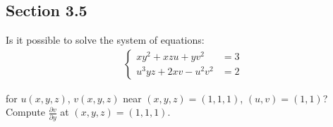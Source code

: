 \subsection{Section 3.5}

\begin{tcolorbox}[
        title={Problem 18},
        valign=center,
        nobeforeafter,
        colframe=gray!95!black
    ]
Is it possible to solve the system of equations:
\begin{align}
    \begin{cases}
        xy^2 + xzu + yv^2 &= 3 \\
    u^3yz + 2xv - u^2v^2 &= 2
    \end{cases}
\end{align}

for \(u(x, y, z)\), \(v(x, y, z)\) near
\((x, y, z) = (1, 1, 1)\), \((u, v) = (1, 1)\)? \\

Compute \(\frac{\partial v}{\partial y}\) at \((x, y, z) = (1, 1, 1)\).
\end{tcolorbox}

